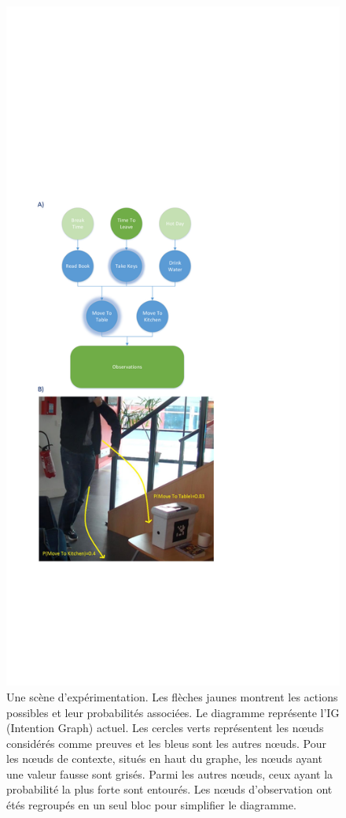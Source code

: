 \documentclass[a4paper,11pt,twoside]{StyleThese}
\begin{document}
 \begin{figure}[h!]
	\centering
	\includegraphics[trim={2cm 11cm 11cm 17cm},clip,scale=0.56]{img/cookieScenario.pdf}
	\caption{Une scène d'expérimentation. Les flèches jaunes montrent les actions possibles et leur probabilités associées. Le diagramme représente l'IG (Intention Graph) actuel. Les cercles verts représentent les nœuds considérés comme preuves et les bleus sont les autres nœuds. Pour les nœuds de contexte, situés en haut du graphe, les nœuds ayant une valeur fausse sont grisés. Parmi les autres nœuds, ceux ayant la probabilité la plus forte sont entourés. Les nœuds d'observation ont étés regroupés en un seul bloc pour simplifier le diagramme.}
	\label{fig:intention_graph}
   	\vspace{-20pt}
\end{figure}
\end{document}
